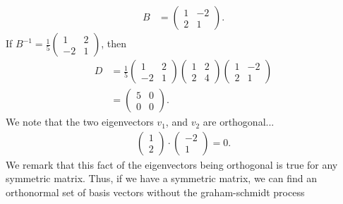 \documentclass{report}
\begin{document}
\begin{itemize}
            \begin{align*}
                B &= \begin{pmatrix}  1 & -2 \\ 2 & 1\end{pmatrix}
            .\end{align*}
            If $B^{-1} = \frac{1}{5}\begin{pmatrix} 1 & 2 \\ -2 & 1\end{pmatrix}$, then 
            \begin{align*}
                D &= \frac{1}{5}\begin{pmatrix} 1 & 2 \\ -2 & 1\end{pmatrix} \begin{pmatrix} 1 & 2 \\ 2 & 4 \end{pmatrix}\begin{pmatrix} 1 & -2 \\ 2 & 1 \end{pmatrix} \\
                  &= \begin{pmatrix} 5 & 0 \\ 0 & 0  \end{pmatrix}
            .\end{align*}
            We note that the two eigenvectors $v_{1}$, and $v_{2}$ are orthogonal...
            \begin{align*}
                \begin{pmatrix}  1 \\ 2\end{pmatrix} \cdot \begin{pmatrix} -2 \\ 1  \end{pmatrix} = 0
            .\end{align*}
            \bigbreak \noindent 
            We remark that this fact of the eigenvectors being orthogonal is true for any symmetric matrix. Thus, if we have a symmetric matrix, we can find an orthonormal set of basis vectors without the graham-schmidt process



    \end{itemize}

    \pagebreak 
\end{document}

